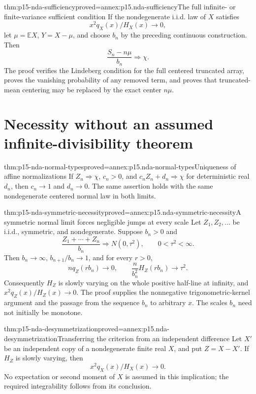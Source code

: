 \begin{hbtheorem}{thm:p15-nda-sufficiency}{proved=annex:p15.nda-sufficiency}{The full infinite- or finite-variance sufficient condition}
If the nondegenerate i.i.d. law of \(X\) satisfies
\[
 x^2q_X(x)/H_X(x)\to0,
 \]
let \(\mu=\mathbb EX\), \(Y=X-\mu\), and choose \(b_n\)
by the preceding continuous construction. Then
\[
 \frac{S_n-n\mu}{b_n}\Rightarrow\chi.
 \]
The proof verifies the Lindeberg condition for the full centered
truncated array, proves the vanishing probability of any removed
term, and proves that truncated-mean centering may be replaced by
the exact center \(n\mu\).
\end{hbtheorem}

\section{Necessity without an assumed infinite-divisibility theorem}
\label{sec:p15-nda-necessity}

\begin{hblemma}{thm:p15-nda-normal-types}{proved=annex:p15.nda-normal-types}{Uniqueness of affine normalizations}
If \(Z_n\Rightarrow\chi\), \(c_n>0\), and
\(c_nZ_n+d_n\Rightarrow\chi\) for deterministic real \(d_n\),
then \(c_n\to1\) and \(d_n\to0\).
The same assertion holds with the same nondegenerate centered
normal law in both limits.
\end{hblemma}

\begin{hbtheorem}{thm:p15-nda-symmetric-necessity}{proved=annex:p15.nda-symmetric-necessity}{A symmetric normal limit forces negligible jumps at every scale}
Let \(Z_1,Z_2,\ldots\) be i.i.d., symmetric, and nondegenerate.
Suppose \(b_n>0\) and
\[
 \frac{Z_1+\cdots+Z_n}{b_n}\Rightarrow N(0,\tau^2),
 \qquad 0<\tau^2<\infty.
 \]
Then \(b_n\to\infty\), \(b_{n+1}/b_n\to1\), and for every \(r>0\),
\[
 n q_Z(rb_n)\to0,\qquad
 \frac{n}{b_n^2}H_Z(rb_n)\to\tau^2.
 \]
Consequently \(H_Z\) is slowly varying on the whole positive
half-line at infinity, and \(x^2q_Z(x)/H_Z(x)\to0\).
The proof supplies the nonnegative trigonometric-kernel argument
and the passage from the sequence \(b_n\) to arbitrary \(x\).
The scales \(b_n\) need not initially be monotone.
\end{hbtheorem}

\begin{hbtheorem}{thm:p15-nda-desymmetrization}{proved=annex:p15.nda-desymmetrization}{Transferring the criterion from an independent difference}
Let \(X'\) be an independent copy of a nondegenerate finite
real \(X\), and put \(Z=X-X'\).
If \(H_Z\) is slowly varying, then
\[
 x^2q_X(x)/H_X(x)\to0.
 \]
No expectation or second moment of \(X\) is assumed in this
implication; the required integrability follows from its conclusion.
\end{hbtheorem}

